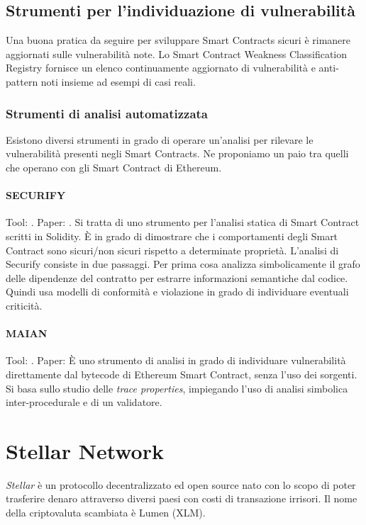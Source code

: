 \subsection{Strumenti per l'individuazione di vulnerabilità}
Una buona pratica da seguire per sviluppare Smart Contracts sicuri è
rimanere aggiornati sulle vulnerabilità note.
Lo Smart Contract Weakness Classification Registry \cite{swc-registry} fornisce un elenco
continuamente aggiornato di vulnerabilità e anti-pattern noti insieme ad esempi
di casi reali.

\subsubsection{Strumenti di analisi automatizzata}
Esistono diversi strumenti in grado di operare un'analisi per
rilevare le vulnerabilità presenti
negli Smart Contracts. Ne proponiamo un paio tra quelli che operano con
gli Smart Contract di Ethereum.

\paragraph{SECURIFY} Tool: \cite{secufiry-url}. Paper: \cite{secufiry-paper}.
Si tratta di uno strumento per l'analisi statica di Smart Contract scritti in Solidity. È in grado
di dimostrare che i comportamenti degli Smart Contract sono sicuri/non sicuri
rispetto a determinate proprietà.
L'analisi di Securify consiste in due passaggi.
Per prima cosa analizza simbolicamente il grafo delle dipendenze
del contratto per estrarre informazioni semantiche dal codice.
Quindi usa modelli di conformità e violazione
in grado di individuare eventuali criticità.

\paragraph{MAIAN} Tool: \cite{maian-url}. Paper: \cite{Nikolic2018FindingTG}
È uno strumento di analisi in grado di individuare vulnerabilità direttamente
dal bytecode di Ethereum Smart Contract, senza l'uso dei sorgenti.
Si basa sullo studio delle \textit{trace properties}, impiegando l'uso di
analisi simbolica inter-procedurale e di un validatore.


\section{Stellar Network}

\textit{Stellar} è un protocollo decentralizzato ed
open source nato con lo scopo di poter
trasferire denaro attraverso diversi
paesi con costi di transazione irrisori. Il nome della criptovaluta scambiata
è Lumen (XLM).

